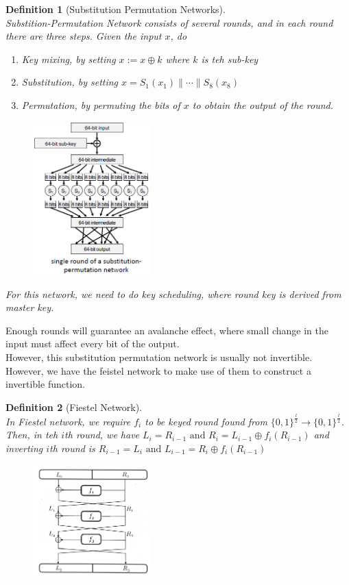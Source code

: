 \documentclass[12pt]{article}
\newtheorem{definition}{Definition}[section]
\theoremstyle{definition}
\begin{document}
\begin{definition}[Substitution Permutation Networks]
\hfill\\\normalfont Substition-Permutation Network consists of several rounds, and in each round there are three steps. Given the input $x$, do 
\begin{enumerate}
  \item Key mixing, by setting $x:=x\oplus k$ where $k$ is teh sub-key
  \item Substitution, by setting $x=S_1(x_1)\|\cdots\|S_8(x_8)$
  \item Permutation, by permuting the bits of $x$ to obtain the output of the round.
\end{enumerate}
\begin{figure}[h]
\centering
\includegraphics[width=0.4\textwidth]{1.png}
\end{figure}
For this network, we need to do key scheduling, where round key is derived from master key.
\end{definition}
Enough rounds will guarantee an avalanche effect, where small change in the input must affect every bit of the output.\\
However, this substitution permutation network is usually not invertible. However, we have the feistel network to make use of them to construct a invertible function.
\begin{definition}[Fiestel Network]
\hfill\\\normalfont In Fiestel network, we require $f_i$ to be keyed round found from $\{0,1\}^{\frac{l}{2}}\to\{0,1\}^{\frac{l}{2}}$. Then, in teh $i$th round, we have
$
L_i=R_{i-1}\text{ and }R_i=L_{i-1}\oplus f_i(R_{i-1})
$
and inverting $i$th round is
$
R_{i-1}=L_i\text{ and }L_{i-1}=R_i\oplus f_i(R_{i-1})
$
\begin{figure}[h]
\centering
\includegraphics[width=0.4\textwidth]{2.png}
\end{figure}
\end{definition}
\end{document}

